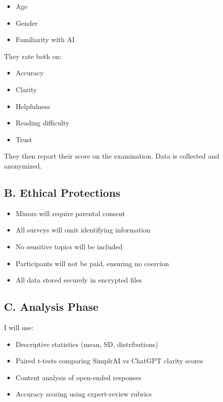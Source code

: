\documentclass[11pt]{article}
\begin{document}
\begin{itemize}[leftmargin=1.6em]
  \item Age
  \item Gender
  \item Familiarity with AI
\end{itemize}

They rate both on:

\begin{itemize}[leftmargin=1.6em]
  \item Accuracy
  \item Clarity
  \item Helpfulness
  \item Reading difficulty
  \item Trust
\end{itemize}

They then report their score on the examination. Data is collected and
anonymized.

\subsection*{B. Ethical Protections}

\begin{itemize}[leftmargin=1.6em]
  \item Minors will require parental consent
  \item All surveys will omit identifying information
  \item No sensitive topics will be included
  \item Participants will not be paid, ensuring no coercion
  \item All data stored securely in encrypted files
\end{itemize}

\subsection*{C. Analysis Phase}

I will use:

\begin{itemize}[leftmargin=1.6em]
  \item Descriptive statistics (mean, SD, distributions)
  \item Paired t-tests comparing SimplrAI vs ChatGPT clarity scores
  \item Content analysis of open-ended responses
  \item Accuracy scoring using expert-review rubrics
\end{itemize}
\end{document}
